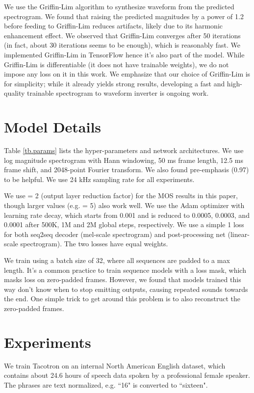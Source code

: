 \documentclass{article} \usepackage{iclr2017_conference,times}
\begin{document}
We use the Griffin-Lim algorithm \citep{griffin1984signal} to synthesize waveform from the predicted spectrogram. We found that raising the predicted magnitudes by a power of 1.2 before feeding to Griffin-Lim reduces artifacts, likely due to its harmonic enhancement effect. We observed that Griffin-Lim converges after 50 iterations (in fact, about 30 iterations seems to be enough), which is reasonably fast. We implemented Griffin-Lim in TensorFlow \citep{abadi2016tensorflow} hence it's also part of the model. While Griffin-Lim is differentiable (it does not have trainable weights), we do not impose any loss on it in this work. We emphasize that our choice of Griffin-Lim is for simplicity; while it already yields strong results, developing a fast and high-quality trainable spectrogram to waveform inverter is ongoing work. 

\section{Model Details}
Table \ref{tb.params} lists the hyper-parameters and network architectures. We use log magnitude spectrogram with Hann windowing, 50 ms frame length, 12.5 ms frame shift, and 2048-point Fourier transform. We also found pre-emphasis (0.97) to be helpful. We use 24 kHz sampling rate for all experiments.

We use  = 2 (output layer reduction factor) for the MOS results in this paper, though larger  values (e.g.  = 5) also work well. We use the Adam optimizer \citep{kingma2015adam} with learning rate decay, which starts from 0.001 and is reduced to 0.0005, 0.0003, and 0.0001 after 500K, 1M and 2M global steps, respectively. We use a simple 1 loss for both seq2seq decoder (mel-scale spectrogram) and post-processing net (linear-scale spectrogram). The two losses have equal weights.

We train using a batch size of 32, where all sequences are padded to a max length. It's a common practice to train sequence models with a loss mask, which masks loss on zero-padded frames. However, we found that models trained this way don't know when to stop emitting outputs, causing repeated sounds towards the end. One simple trick to get around this problem is to also reconstruct the zero-padded frames.

\section{Experiments}
We train Tacotron on an internal North American English dataset, which contains about 24.6 hours of speech data spoken by a professional female speaker. The phrases are text normalized, e.g. ``16" is converted to ``sixteen".
\end{document}
